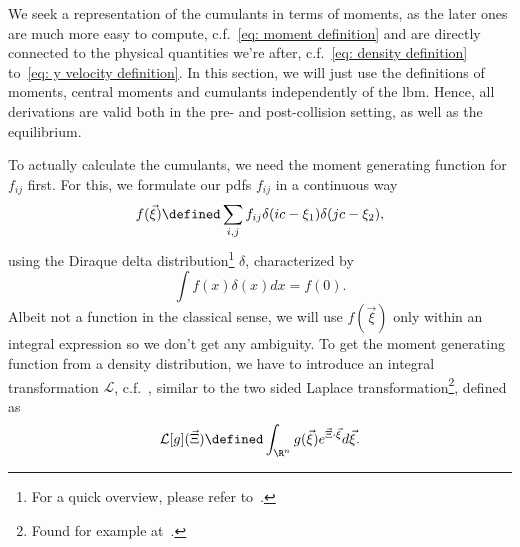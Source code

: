 We seek a representation of the cumulants in terms of moments, as the later ones are much more easy to compute, c.f.~\eqref{eq: moment definition} and are directly connected to the physical quantities we're after, c.f.~\eqref{eq: density definition} to~\eqref{eq: y velocity definition}.
In this section, we will just use the definitions of moments, central moments and cumulants independently of the \gls{lbm}.
Hence, all derivations are valid both in the pre- and post-collision setting, as well as the equilibrium.

To actually calculate the cumulants, we need the moment generating function for $f_{ij}$ first.
For this, we formulate our \glspl{pdf} $f_{ij}$ in a continuous way
\begin{equation}
  \label{eq:Definition of f xi}
  f(\vec{\xi}) \defined \sum_{i,j} f_{ij}\delta(ic - \xi_1)\delta(jc - \xi_2),
\end{equation}
using the Diraque delta distribution\footnote{For a quick overview, please refer to~\cite{weissteinDelta}.} $\delta$, characterized by
\begin{equation}
  \label{eq: diraque feature}
  \int f(x)\delta(x)dx = f(0).
\end{equation}
Albeit not a function in the classical sense, we will use $f(\vec{\xi})$ only within an integral expression so we don't get any ambiguity.
To get the moment generating function from a density distribution, we have to introduce an integral transformation $\mathcal{L}$, c.f.~\cite{weissteinMGF}, similar to the two sided Laplace transformation\footnote{Found for example at~\cite{weissteinLaplace}.}, defined as
\begin{equation}
  \label{eq: Definition of integral transformation}
  \mathcal{L}[g](\vec{\Xi}) \defined \int_{\R^n} g(\vec{\xi}) e^{\vec{\Xi} \cdot \vec{\xi}}d\vec{\xi}.
\end{equation}

